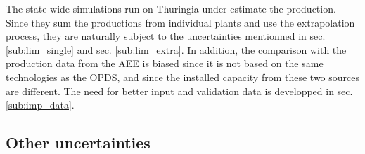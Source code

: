 The state wide simulations run on Thuringia under-estimate the production. Since they sum the productions from individual plants and use the extrapolation process, they are naturally subject to the uncertainties mentionned in sec. \ref{sub:lim_single} and sec. \ref{sub:lim_extra}. In addition, the comparison with the production data from the AEE is biased since it is not based on the same technologies as the OPDS, and since the installed capacity from these two sources are different. The need for better input and validation data is developped in sec. \ref{sub:imp_data}.

\subsection{Other uncertainties}
\label{sub:limits_others}

